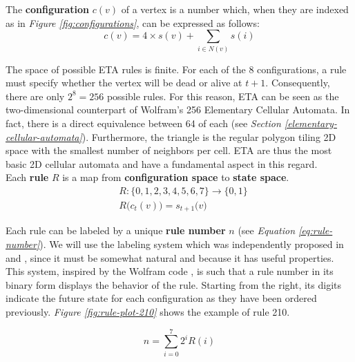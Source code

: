 \documentclass{article}
\begin{document}
The \textbf{configuration} $c(v)$ of a vertex is a number which, when they are indexed as in \linebreak \textit{Figure \ref{fig:configurations}}, can be expressed as follows:
\begin{equation}
c(v)=4\times s(v)+\sum_{i\in N(v)} s(i)
\end{equation}

The space of possible ETA rules is finite. For each of the 8 configurations, a rule must specify whether the vertex will be dead or alive at $t+1$. Consequently, there are only $2^8=256$ possible rules. For this reason, ETA can be seen as the two-dimensional counterpart of Wolfram’s 256 Elementary Cellular Automata\cite{wolfram2002new, weisstein2002elementary}. In fact, there is a direct equivalence between 64 of each (see \textit{Section \ref{elementary-cellular-automata}}). Furthermore, the triangle is the regular polygon tiling 2D space with the smallest number of neighbors per cell. ETA are thus the most basic 2D cellular automata and have a fundamental aspect in this regard. \\

\noindent Each \textbf{rule} $R$ is a map from \textbf{configuration space} to \textbf{state space}.
\begin{equation}
\begin{aligned}
& R: \{0,1,2,3,4,5,6,7\}\rightarrow\{0,1\}\\  
& R\big(c_t(v)\big)=s_{t+1}\big(v\big)
\end{aligned}
\end{equation}

Each rule can be labeled by a unique \textbf{rule number} $n$ (see \textit{Equation \ref{eq:rule-number}}). We will use the labeling system which was independently proposed in \cite{zawidzkiApplicationSemitotalistic2D2011} and \cite{cousin2022organic}, since it must be somewhat natural and because it has useful properties. This system, inspired by the Wolfram code \cite{wolfram2002new}, is such that a rule number in its binary form displays the behavior of the rule. Starting from the right, its digits indicate the future state for each configuration as they have been ordered previously. \textit{Figure \ref{fig:rule-plot-210}} shows the example of rule 210.

\begin{equation} \label{eq:rule-number}
    n=\sum_{i=0}^7 2^i R(i)
\end{equation}

\vspace{20pt}
\end{document}
